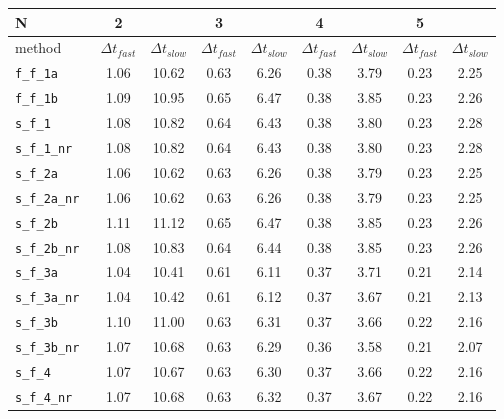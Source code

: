 \begin{tabular}{l|cc|cc|cc|cc}
N& 2  &  & 3  &  & 4  &  & 5  &  \\
\hline
method& $\Delta t_{fast}$  & $\Delta t_{slow}$& $\Delta t_{fast}$  & $\Delta t_{slow}$& $\Delta t_{fast}$  & $\Delta t_{slow}$& $\Delta t_{fast}$  & $\Delta t_{slow}$\\
\hline
\verb|f_f_1a | & 1.06 & 10.62 & 0.63 & 6.26 & 0.38 & 3.79 & 0.23 & 2.25 \\
\verb|f_f_1b | & 1.09 & 10.95 & 0.65 & 6.47 & 0.38 & 3.85 & 0.23 & 2.26 \\
\verb|s_f_1 | & 1.08 & 10.82 & 0.64 & 6.43 & 0.38 & 3.80 & 0.23 & 2.28 \\
\verb|s_f_1_nr | & 1.08 & 10.82 & 0.64 & 6.43 & 0.38 & 3.80 & 0.23 & 2.28 \\
\verb|s_f_2a | & 1.06 & 10.62 & 0.63 & 6.26 & 0.38 & 3.79 & 0.23 & 2.25 \\
\verb|s_f_2a_nr | & 1.06 & 10.62 & 0.63 & 6.26 & 0.38 & 3.79 & 0.23 & 2.25 \\
\verb|s_f_2b | & 1.11 & 11.12 & 0.65 & 6.47 & 0.38 & 3.85 & 0.23 & 2.26 \\
\verb|s_f_2b_nr | & 1.08 & 10.83 & 0.64 & 6.44 & 0.38 & 3.85 & 0.23 & 2.26 \\
\verb|s_f_3a | & 1.04 & 10.41 & 0.61 & 6.11 & 0.37 & 3.71 & 0.21 & 2.14 \\
\verb|s_f_3a_nr | & 1.04 & 10.42 & 0.61 & 6.12 & 0.37 & 3.67 & 0.21 & 2.13 \\
\verb|s_f_3b | & 1.10 & 11.00 & 0.63 & 6.31 & 0.37 & 3.66 & 0.22 & 2.16 \\
\verb|s_f_3b_nr | & 1.07 & 10.68 & 0.63 & 6.29 & 0.36 & 3.58 & 0.21 & 2.07 \\
\verb|s_f_4 | & 1.07 & 10.67 & 0.63 & 6.30 & 0.37 & 3.66 & 0.22 & 2.16 \\
\verb|s_f_4_nr | & 1.07 & 10.68 & 0.63 & 6.32 & 0.37 & 3.67 & 0.22 & 2.16 \\
\hline
\end{tabular}
